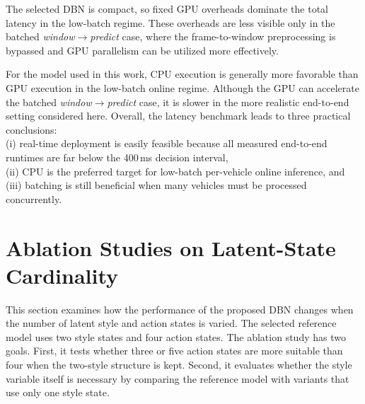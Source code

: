 \par The selected \ac{DBN} is compact, so fixed GPU overheads dominate the total latency in the low-batch regime. These overheads are less visible only 
in the batched \textit{window$\rightarrow$predict} case, where the frame-to-window preprocessing is bypassed and GPU parallelism can be utilized more effectively.

\par For the model used in this work, CPU execution is generally more favorable than GPU execution in the low-batch online regime. 
Although the GPU can accelerate the batched \textit{window$\rightarrow$predict} case, it is slower in the more realistic end-to-end setting considered here. 
Overall, the latency benchmark leads to three practical conclusions: \\
(i) real-time deployment is easily feasible because all measured end-to-end runtimes are far below the 400\,ms decision interval, \\
(ii) CPU is the preferred target for low-batch per-vehicle online inference, and \\
(iii) batching is still beneficial when many vehicles must be processed concurrently.

\section{Ablation Studies on Latent-State Cardinality}
This section examines how the performance of the proposed \ac{DBN} changes when the number of latent style and action states is varied. 
The selected reference model uses two style states and four action states. 
The ablation study has two goals. 
First, it tests whether three or five action states are more suitable than four when the two-style structure is kept. 
Second, it evaluates whether the style variable itself is necessary by comparing the reference model with variants that use only one style state.

